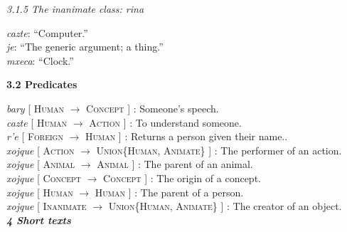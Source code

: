 \documentclass{article}[10pt]
\newcommand{\define}[4]{\emph{#1} [ \textsc{#2} $\rightarrow$ \textsc{#3} ] : #4. \\}
\newcommand{\defarg}[2]{\emph{#1}: ``#2.''\\}
\begin{document}
\emph{3.1.5 The inanimate class: \emph{rina}}
\begin{multicols}{3}
\noindent
\defarg{cazte}{Computer}
\defarg{je}{The generic argument; a thing}
\defarg{mxeca}{Clock}
\end{multicols}

{\bf 3.2 Predicates}

\noindent
\define{bary}{Human}{Concept}{Someone's speech}
\define{cazte}{Human}{Action}{To understand someone}
\define{r'e}{Foreign}{Human}{Returns a person given their name.}
\define{xojque}{Action}{Union\{Human, Animate\}}{The performer of an action}
\define{xojque}{Animal}{Animal}{The parent of an animal}
\define{xojque}{Concept}{Concept}{The origin of a concept}
\define{xojque}{Human}{Human}{The parent of a person}
\define{xojque}{Inanimate}{Union\{Human, Animate\}}{The creator of an object}

\clearpage
{\bf \emph{4 Short texts}}\\
\end{document}
